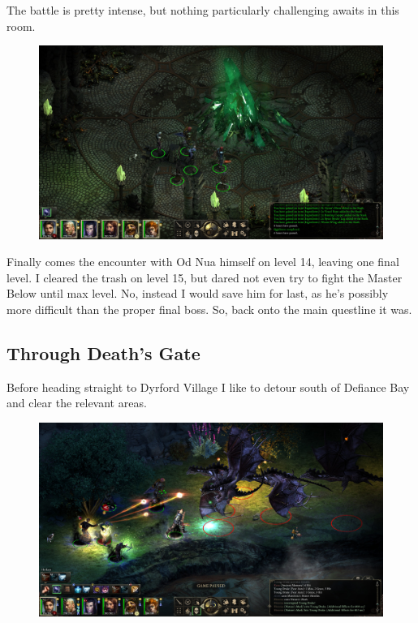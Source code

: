 \documentclass{article}
\begin{document}
The battle is pretty intense, but nothing particularly challenging awaits in this room.

\begin{figure}
\includegraphics[scale=0.33]{files/blog/2018_11_25_pillars_of_eternity_path_of_the_damned_act_ii/2018_11_25_paths_l14.jpg}
\end{figure}

Finally comes the encounter with Od Nua himself on level 14, leaving one final level.  I cleared the trash on level 15, but dared not even try to fight the Master Below until max level.  No, instead I would save him for last, as he's possibly more difficult than the proper final boss.  So, back onto the main questline it was.

\subsection{Through Death's Gate}
Before heading straight to Dyrford Village I like to detour south of Defiance Bay and clear the relevant areas.

\begin{figure}
\includegraphics[scale=0.33]{files/blog/2018_11_25_pillars_of_eternity_path_of_the_damned_act_ii/2018_11_25_searingfalls.jpg}
\end{figure}
\end{document}
